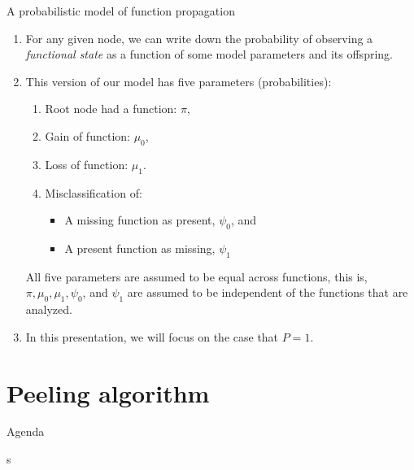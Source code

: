 \documentclass[9pt,handout,ignorenonframetext,]{beamer}
\providecommand{\tightlist}{%
  \setlength{\itemsep}{0pt}\setlength{\parskip}{0pt}}
\begin{document}
\begin{frame}{A probabilistic model of function propagation}

\begin{enumerate}
\def\labelenumi{\arabic{enumi}.}
\item
  For any given node, we can write down the probability of observing a
  \emph{functional state} as a function of some model parameters and its
  offspring. \pause
\item
  This version of our model has five parameters (probabilities): \pause

  \begin{enumerate}
  \def\labelenumii{\alph{enumii}.}
  \tightlist
  \item
    Root node had a function: \(\pi\),
  \item
    Gain of function: \(\mu_0\),
  \item
    Loss of function: \(\mu_1\).
  \item
    Misclassification of:

    \begin{itemize}
    \tightlist
    \item
      A missing function as present, \(\psi_0\), and
    \item
      A present function as missing, \(\psi_1\) \pause
    \end{itemize}
  \end{enumerate}

  All five parameters are assumed to be equal across functions, this is,
  \(\pi, \mu_0, \mu_1, \psi_0\), and \(\psi_1\) are assumed to be
  independent of the functions that are analyzed.\pause
\item
  In this presentation, we will focus on the case that \(P = 1\).
\end{enumerate}

\end{frame}

\section{Peeling algorithm}\label{peeling-algorithm}

\begin{frame}[t]{Agenda}

\tableofcontents[currentsection]s

\end{frame}
\end{document}
